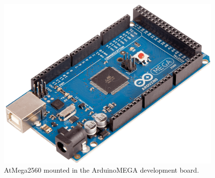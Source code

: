 \begin{figure}[H]
	\centering
	\includegraphics[scale=0.12]{figures/ARDUINO_MEGA}
	\caption{AtMega2560 mounted in the ArduinoMEGA development board.\cite{ArduinoMegaImage}}
	\label{fig:ATmega}
\end{figure}
%
